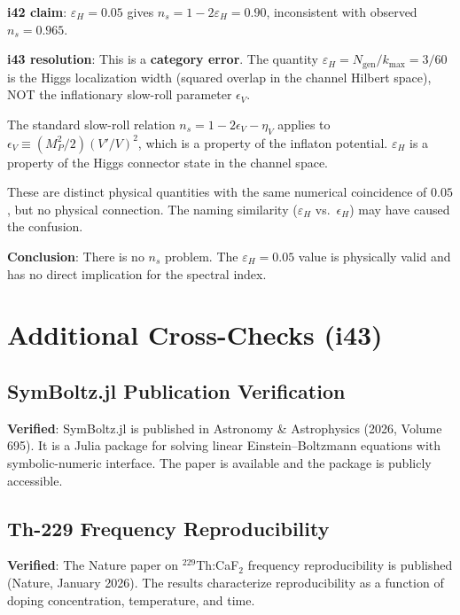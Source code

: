 \documentclass[11pt,a4paper]{article}
\begin{document}
\begin{tcolorbox}[colback=green!5!white, colframe=green!60!black,
  title={Cross-Check: $\varepsilon_H$ Category Error Clarified}]

\textbf{i42 claim}: $\varepsilon_H = 0.05$ gives $n_s = 1 - 2\varepsilon_H = 0.90$, inconsistent with observed $n_s = 0.965$.

\textbf{i43 resolution}: This is a \textbf{category error}. The quantity $\varepsilon_H = N_{\text{gen}}/k_{\max} = 3/60$ is the Higgs localization width (squared overlap in the channel Hilbert space), NOT the inflationary slow-roll parameter $\epsilon_V$.

The standard slow-roll relation $n_s = 1 - 2\epsilon_V - \eta_V$ applies to $\epsilon_V \equiv (M_P^2/2)(V'/V)^2$, which is a property of the inflaton potential. $\varepsilon_H$ is a property of the Higgs connector state in the channel space.

These are distinct physical quantities with the same numerical coincidence of $0.05$, but no physical connection. The naming similarity ($\varepsilon_H$ vs.\ $\epsilon_H$) may have caused the confusion.

\textbf{Conclusion}: There is no $n_s$ problem. The $\varepsilon_H = 0.05$ value is physically valid and has no direct implication for the spectral index.
\end{tcolorbox}

\section{Additional Cross-Checks (i43)}

\subsection{SymBoltz.jl Publication Verification}

\textbf{Verified}: SymBoltz.jl is published in Astronomy \& Astrophysics (2026, Volume 695). It is a Julia package for solving linear Einstein--Boltzmann equations with symbolic-numeric interface. The paper is available and the package is publicly accessible.

\subsection{Th-229 Frequency Reproducibility}

\textbf{Verified}: The Nature paper on $^{229}$Th:CaF$_2$ frequency reproducibility is published (Nature, January 2026). The results characterize reproducibility as a function of doping concentration, temperature, and time.
\end{document}
